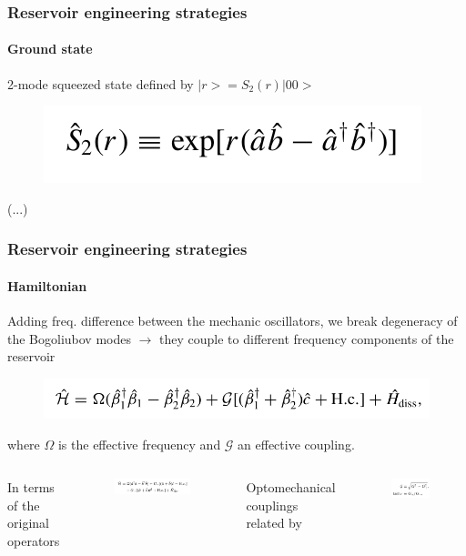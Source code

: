 \documentclass[aspectratio=43]{beamer}
\begin{document}
\begin{frame}
	
	\frametitle{Reservoir engineering strategies}
	\framesubtitle{Ground state}
	
	2-mode squeezed state defined by $|r> = S_{2}(r) |00>$
	\begin{figure}
		\includegraphics[width = 5 cm]{plots/2_squeezed_mode.png}
	\end{figure}	
	
	(...)
	
\end{frame}

\begin{frame}
	
	\frametitle{Reservoir engineering strategies}
	\framesubtitle{Hamiltonian}
	
	Adding freq. difference between the mechanic oscillators, we break degeneracy of the Bogoliubov modes $\longrightarrow$ they couple to different frequency components of the reservoir 
	\begin{figure}
		\includegraphics[width = 8.5 cm]{plots/hamiltonian_3.png}
	\end{figure}	
	
	where $\Omega$ is the effective frequency and $\mathcal{G}$ an effective coupling.
	\begin{columns} 
		
		
		In terms of the original operators
		\begin{figure}
			\includegraphics[width = 7.5 cm]{plots/hamiltonian_4.png}
		\end{figure}

		
		Optomechanical couplings\\
		related by
		\begin{figure}
			\includegraphics[width = 4 cm]{plots/optomechanic_couplings.png}
		\end{figure}

	\end{columns}

\end{frame}
\end{document}
